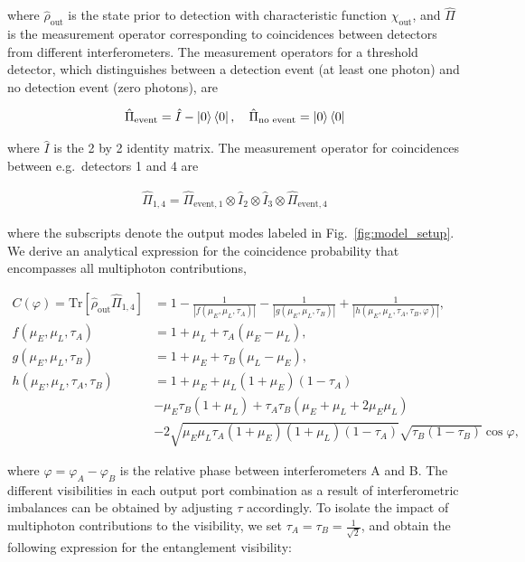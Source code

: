 \documentclass[11pt]{caltech_thesis} %
\begin{document}
where $\hat{\rho}_{\text{out}}$ is the state prior to detection with characteristic function $\chi_{\text{out}}$, and $\hat{\Pi}$ is the measurement operator corresponding to coincidences between detectors from different interferometers. The measurement operators for a threshold detector, which distinguishes between a detection event (at least one photon) and no detection event (zero photons), are

\begin{align}
    \hat{\Pi}_{\text{event}} = \hat{I}-\ket{0}\bra{0}, \quad  \hat{\Pi}_{\text{no event}} = \ket{0}\bra{0}
\end{align}

where $\hat{I}$ is the 2 by 2 identity matrix.
The measurement operator for coincidences between e.g.~detectors 1 and 4 are

\begin{align}
    \hat{\Pi}_{1,4}=\hat{\Pi}_{\text{event},1}\otimes\hat{I}_2 \otimes \hat{I}_3 \otimes \hat{\Pi}_{\text{event},4}
\end{align}

where the subscripts denote the output modes labeled in Fig.~\ref{fig:model_setup}. We derive an analytical expression for the coincidence probability that encompasses all multiphoton contributions,

\begin{align}
C(\varphi) =  \text{Tr}\left[\hat{\rho}_{\text{out}}\hat{\Pi}_{1,4}\right] &= 1-\frac{1}{|f(\mu_E, \mu_L, \tau_A)|}-\frac{1}{|g(\mu_E, \mu_L, \tau_B)|}+\frac{1}{|h(\mu_E, \mu_L, \tau_A, \tau_B,\varphi)|},\\
f(\mu_E, \mu_L, \tau_A) &= 1+\mu_L+\tau_A(\mu_E - \mu_L),\\
g(\mu_E, \mu_L, \tau_B) &= 1+\mu_E+\tau_B(\mu_L - \mu_E),\\
h(\mu_E, \mu_L, \tau_A, \tau_B) &=1+\mu_E + \mu_L(1 + \mu_E)(1 -\tau_A) \\
&-\mu_E\tau_B(1 + \mu_L) +\tau_A\tau_B(\mu_E  + \mu_L +2\mu_E\mu_L) \nonumber\\
&- 2\sqrt{\mu_E\mu_L\tau_A(1+\mu_E)(1+\mu_L)(1-\tau_A)}\sqrt{\tau_B(1-\tau_B)}\cos{\varphi},\nonumber
\end{align}

where $\varphi = \varphi_A-\varphi_B$ is the relative phase between interferometers A and B.
The different visibilities in each output port combination as a result of interferometric imbalances can be obtained by adjusting $\tau$ accordingly. To isolate the impact of multiphoton contributions to the visibility, we set $\tau_A = \tau_B = \frac{1}{\sqrt{2}}$, and obtain the following expression for the entanglement visibility:
\end{document}
